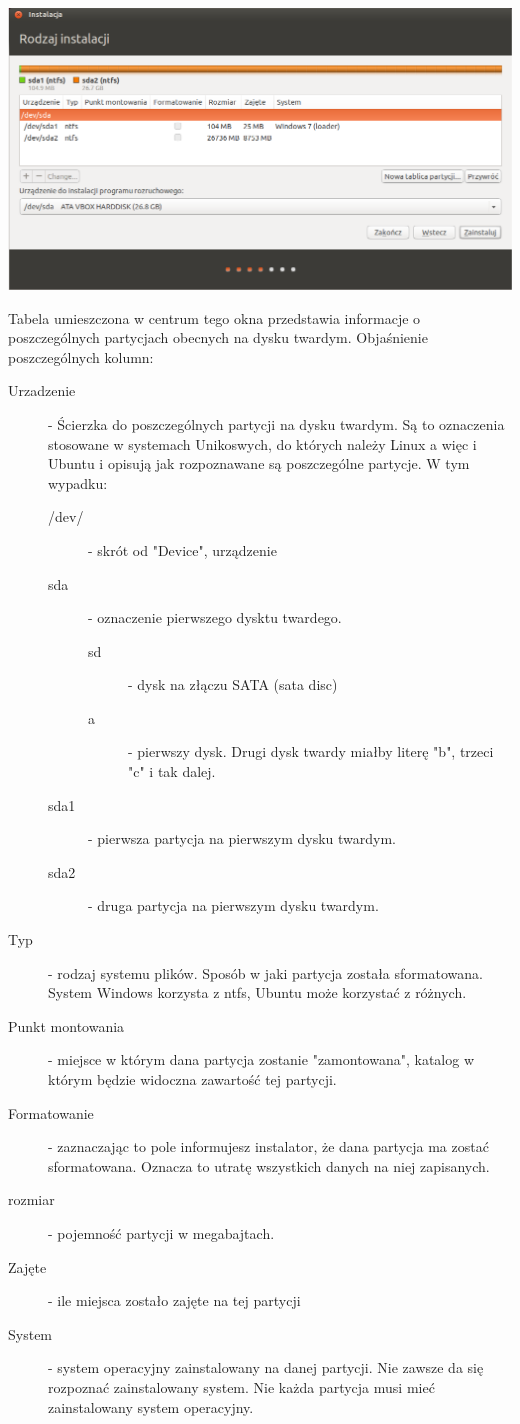 \clearpage
\begin{center}
	\includegraphics[scale=0.5]{images/instalator_partycjonowanie_gparted2_czysty.png}
\end{center}
Tabela umieszczona w centrum tego okna przedstawia informacje o poszczególnych partycjach obecnych na dysku twardym. Objaśnienie poszczególnych kolumn:
\begin{description}
\item[Urzadzenie] - Ścierzka do poszczególnych partycji na dysku twardym. Są to oznaczenia stosowane w systemach Unikoswych, do których należy Linux a więc i Ubuntu i opisują jak rozpoznawane są poszczególne partycje. W tym wypadku:
	\begin{description}
	\item[/dev/] - skrót od "Device", urządzenie
	\item[sda] - oznaczenie pierwszego dysktu twardego.
		\begin{description}
			\item[sd] - dysk na złączu SATA (sata disc)
			\item[a] - pierwszy dysk. Drugi dysk twardy miałby literę "b", trzeci "c" i tak dalej.
		\end{description}
	\item[sda1] - pierwsza partycja na pierwszym dysku twardym.
	\item[sda2] - druga partycja na pierwszym dysku twardym.
	\end{description}
\item[Typ] - rodzaj systemu plików. Sposób w jaki partycja została sformatowana. System Windows korzysta z ntfs, Ubuntu może korzystać z różnych.
\item[Punkt montowania] - miejsce w którym dana partycja zostanie "zamontowana", katalog w którym będzie widoczna zawartość tej partycji.
\item[Formatowanie] - zaznaczając to pole informujesz instalator, że dana partycja ma zostać sformatowana. Oznacza to utratę wszystkich danych na niej zapisanych.
\item[rozmiar] - pojemność partycji w megabajtach.
\item[Zajęte] - ile miejsca zostało zajęte na tej partycji
\item[System] - system operacyjny zainstalowany na danej partycji. Nie zawsze da się rozpoznać zainstalowany system. Nie każda partycja musi mieć zainstalowany system operacyjny. 
\end{description}
\clearpage
